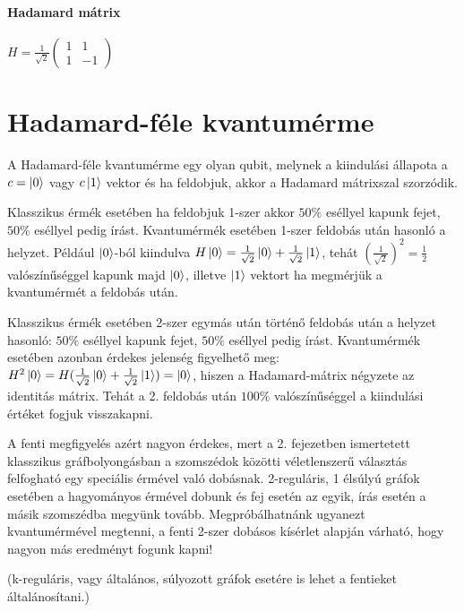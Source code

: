 \paragraph{Hadamard mátrix}

\begin{center}
  $H = \frac{1}{\sqrt{2}}\begin{pmatrix}
      1 & 1  \\
      1 & -1
    \end{pmatrix}$
\end{center}

\section{Hadamard-féle kvantumérme}

A Hadamard-féle kvantumérme egy olyan qubit, melynek a kiindulási állapota a $c
  = \ket{0}$ vagy $c \ket{1}$ vektor és ha feldobjuk, akkor a Hadamard mátrixszal
szorzódik.

Klasszikus érmék esetében ha feldobjuk 1-szer akkor $50\%$ eséllyel kapunk
fejet, $50\%$ eséllyel pedig írást. Kvantumérmék esetében 1-szer feldobás után
hasonló a helyzet. Például $\ket{0}$-ból kiindulva $H\ket{0} =
  \frac{1}{\sqrt{2}}\ket{0} + \frac{1}{\sqrt{2}}\ket{1}$, tehát
$(\frac{1}{\sqrt{2}})^2 = \frac{1}{2}$ valószínűséggel kapunk majd $\ket{0}$,
illetve $\ket{1}$ vektort ha megmérjük a kvantumérmét a feldobás után.

Klasszikus érmék esetében 2-szer egymás után történő feldobás után a helyzet
hasonló: $50\%$ eséllyel kapunk fejet, $50\%$ eséllyel pedig írást.
Kvantumérmék esetében azonban érdekes jelenség figyelhető meg: $H^2\ket{0} =
  H(\frac{1}{\sqrt{2}}\ket{0} + \frac{1}{\sqrt{2}}\ket{1}) = \ket{0}$, hiszen a
Hadamard-mátrix négyzete az identitás mátrix. Tehát a 2. feldobás után $100\%$
valószínűséggel a kiindulási értéket fogjuk visszakapni.

A fenti megfigyelés azért nagyon érdekes, mert a 2. fejezetben ismertetett
klasszikus gráfbolyongásban a szomszédok közötti véletlenszerű választás
felfogható egy speciális érmével való dobásnak. 2-reguláris, 1 élsúlyú gráfok
esetében a hagyományos érmével dobunk és fej esetén az egyik, írás esetén a
másik szomszédba megyünk tovább. Megpróbálhatnánk ugyanezt kvantumérmével
megtenni, a fenti 2-szer dobásos kísérlet alapján várható, hogy nagyon más
eredményt fogunk kapni!

(k-reguláris, vagy általános, súlyozott gráfok esetére is lehet a fentieket
általánosítani.)


